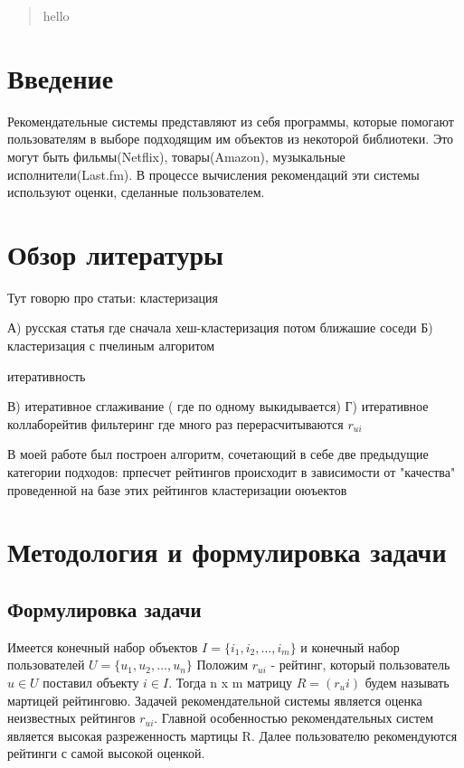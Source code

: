 \documentclass[12pt]{article} %
\begin{document}
\begin{abstract}
hello
\end{abstract}

\section{Введение}
\par Рекомендательные системы представляют из себя программы, которые помогают пользователям в выборе подходящим им объектов из некоторой библиотеки.  %
Это могут быть фильмы(Netflix), товары(Amazon), музыкальные исполнители(Last.fm). В процессе вычисления рекомендаций эти системы используют оценки, сделанные пользователем. 


\section{Обзор литературы}


Тут говорю про статьи:
кластеризация

А) русская статья где сначала хеш-кластеризация потом ближашие соседи
Б) кластеризация с пчелиным алгоритом

итеративность

В) итеративное сглаживание ( где по одному выкидывается)
Г) итеративное коллаборейтив фильтеринг где много раз перерасчитываются $r_{ui}$ 

В моей работе был построен алгоритм, сочетающий в себе две предыдущие категории подходов: прпесчет рейтингов происходит в зависимости от "качества" проведенной
на базе этих рейтингов кластеризации оюъектов


\section{Методология и формулировка задачи}
\subsection{Формулировка задачи}
\par
Имеется конечный набор объектов $I=\{i_{1}, i_{2}, \dots, i_{m}\}$ и конечный набор пользователей $U=\{u_{1}, u_{2}, \dots, u_{n}\}$
Положим $r_{ui}$ - рейтинг, который пользователь $u\in U$ поставил объекту $i\in I$. Тогда n x m матрицу  $R = (r_ui) $ будем называть мартицей рейтинговю. Задачей рекомендательной системы является оценка неизвестных рейтингов $r_{ui}$. Главной особенностью рекомендательных систем является высокая разреженность мартицы R.
Далее пользователю рекомендуются рейтинги с самой высокой оценкой. 
\end{document}
